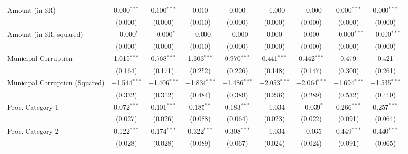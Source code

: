 \documentclass[border = 1pt$]{standalone}
\begin{document}
\begin{tabular}{l@{\extracolsep{4pt}}c@{\extracolsep{1pt}}c@{\extracolsep{3pt}}c@{\extracolsep{1pt}}c@{\extracolsep{4pt}}c@{\extracolsep{1pt}}c@{\extracolsep{3pt}}c@{\extracolsep{1pt}}c@{\extracolsep{1pt}}}
Amount (in \$R)                 & 0.000$^{***}$   & 0.000$^{***}$ & 0.000              & 0.000           & $-$0.000         & $-$0.000        & 0.000$^{***}$    & 0.000$^{***}$    \\
                                & (0.000)         & (0.000)       & (0.000)            & (0.000)         & (0.000)          & (0.000)         & (0.000)          & (0.000)          \\
Amount (in \$R, squared)        & $-$0.000$^{*}$  & $-$0.000$^{*}$& $-$0.000           & $-$0.000        & 0.000            & 0.000           & $-$0.000$^{***}$ & $-$0.000$^{***}$ \\
                                & (0.000)         & (0.000)       & (0.000)            & (0.000)         & (0.000)          & (0.000)         & (0.000)          & (0.000)          \\
Municipal Corruption            & 1.015$^{***}$   & 0.768$^{***}$ & 1.303$^{***}$      & 0.970$^{***}$   & 0.441$^{***}$    & 0.442$^{***}$   & 0.479            & 0.421            \\
                                & (0.164)         & (0.171)       & (0.252)            & (0.226)         & (0.148)          & (0.147)         & (0.300)          & (0.261)          \\
Municipal Corruption (Squared)  & $-$1.544$^{***}$& $-$1.406$^{***}$& $-$1.834$^{***}$ & $-$1.486$^{***}$& $-$2.053$^{***}$ & $-$2.064$^{***}$& $-$1.694$^{***}$ & $-$1.535$^{***}$ \\
                                & (0.332)         & (0.312)       & (0.484)            & (0.389)         & (0.296)          & (0.289)         & (0.532)          & (0.419)          \\
Proc. Category 1                & 0.072$^{***}$   & 0.101$^{***}$ & 0.185$^{**}$       & 0.183$^{***}$   & $-$0.034         & $-$0.039$^{*}$  & 0.266$^{***}$    & 0.257$^{***}$    \\
                                & (0.027)         & (0.026)       & (0.088)            & (0.064)         & (0.023)          & (0.022)         & (0.091)          & (0.064)          \\
Proc. Category 2                & 0.122$^{***}$   & 0.174$^{***}$ & 0.322$^{***}$      & 0.308$^{***}$   & $-$0.034         & $-$0.035        & 0.449$^{***}$    & 0.440$^{***}$    \\
                                & (0.028)         & (0.028)       & (0.089)            & (0.067)         & (0.024)          & (0.024)         & (0.091)          & (0.065)          \\

\end{tabular}
\end{document}
